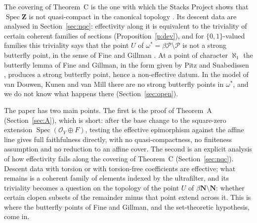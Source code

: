 \documentclass[11pt,a4paper]{amsart}
\theoremstyle{definition}
\theoremstyle{remark}
\newcommand{\Z}{\mathbf Z}
\newcommand{\Pp}{\mathcal P}
\newcommand{\Spec}{\operatorname{Spec}}
\begin{document}
The covering of Theorem~C is the one with which the Stacks Project shows that $\Spec\Z$ is not quasi-compact in the canonical topology \cite[0EUE, 0EUG]{stacks}. Its descent data are analysed in Section~\ref{sec:nqc}: effectivity along it is equivalent to the triviality of certain coherent families of sections (Proposition~\ref{p:dev}), and for $\{0,1\}$-valued families this triviality says that the point $U$ of $\omega^*=\beta\Pp\setminus\Pp$ is not a strong butterfly point, in the sense of Fine and Gillman \cite{fg}. At a point of character $\aleph_1$ the butterfly lemma of Fine and Gillman, in the form given by Pitz and Suabedissen \cite[Lemma~3.1]{pitz}, produces a strong butterfly point, hence a non-effective datum. In the model of van Douwen, Kunen and van Mill \cite{dkm} there are no strong butterfly points in $\omega^*$, and we do not know what happens there (Section~\ref{sec:open}).

The paper has two main points. The first is the proof of Theorem~A (Section~\ref{sec:A}), which is short: after the base change to the square-zero extension $\Spec(\mathcal O_Y\oplus F)$, testing the effective epimorphism against the affine line gives full faithfulness directly, with no quasi-compactness, no finiteness assumption and no reduction to an affine cover. The second is an explicit analysis of how effectivity fails along the covering of Theorem~C (Section~\ref{sec:nqc}). Descent data with torsion or with torsion-free coefficients are effective; what remains is a coherent family of elements indexed by the ultrafilter, and its triviality becomes a question on the topology of the point $U$ of $\beta\mathbf N\setminus\mathbf N$: whether certain clopen subsets of the remainder minus that point extend across it. This is where the butterfly points of Fine and Gillman, and the set-theoretic hypothesis, come in.
\end{document}
